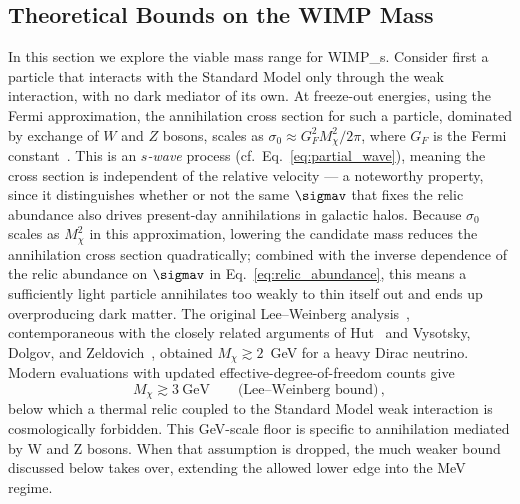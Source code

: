 

\subsection{Theoretical Bounds on the WIMP Mass}
\label{sec:1.2.3}

%
In this section we explore the viable mass range for \glspl{WIMP_}.
Consider first a particle that interacts with the Standard Model only through the weak interaction, with no dark mediator of its own.
At freeze-out energies, using the Fermi approximation, the annihilation cross section for such a particle, dominated by exchange of $W$ and $Z$ bosons, scales as $\sigma_0 \approx G_F^2 M_\chi^2 / 2\pi$, where $G_F$ is the Fermi constant~\cite{Bertone:2004pz}.
This is an \emph{$s$-wave} process (cf.~Eq.~\eqref{eq:partial_wave}), meaning the cross section is independent of the relative velocity --- a noteworthy property, since it distinguishes whether or not the same $\sigmav$ that fixes the relic abundance also drives present-day annihilations in galactic halos.
Because $\sigma_0$ scales as $M_\chi^2$ in this approximation, lowering the candidate mass reduces the annihilation cross section quadratically; combined with the inverse dependence of the relic abundance on $\sigmav$ in Eq.~\eqref{eq:relic_abundance}, this means a sufficiently light particle annihilates too weakly to thin itself out and ends up overproducing dark matter.
The original Lee--Weinberg analysis~\cite{Lee:1977ua}, contemporaneous with the closely related arguments of Hut~\cite{Hut:1977zn} and Vysotsky, Dolgov, and Zeldovich~\cite{Vysotsky:1977pe}, obtained $M_\chi \gtrsim 2$~GeV for a heavy Dirac neutrino. Modern evaluations with updated effective-degree-of-freedom counts give~\cite{Cirelli:2024ssz,Bertone:2004pz}
\begin{equation}
	M_\chi \gtrsim 3~\mathrm{GeV} \qquad \text{(Lee--Weinberg bound)}\,,
	\label{eq:lee_weinberg}
\end{equation}
below which a thermal relic coupled to the Standard Model weak interaction is cosmologically forbidden.
This GeV-scale floor is specific to annihilation mediated by W and Z bosons. When that assumption is dropped, the much weaker \BBN bound discussed below takes over, extending the allowed lower edge into the MeV regime.

